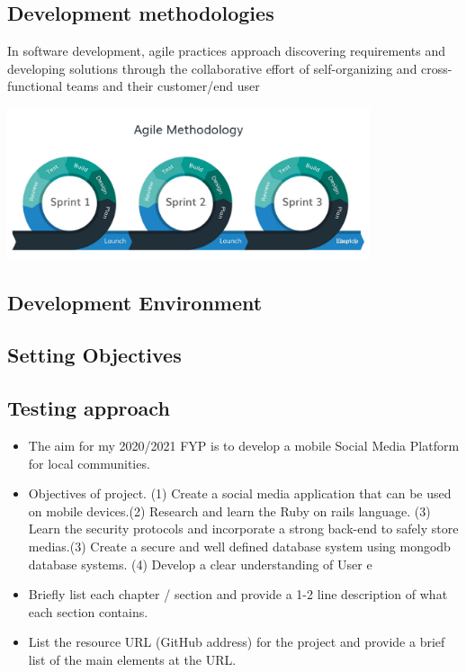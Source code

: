     
    \subsection{ Development methodologies }
    
    
In software development, agile practices approach discovering requirements and developing solutions through the collaborative effort of self-organizing and cross-functional teams and their customer/end user    
    
    
    

    \begin{center}    
      \includegraphics[width=0.8\textwidth]{final-year-project-template-master/img/agileSprint.jpg}
      
      
      


    \end{center}
    \subsection{ Development Environment  }
    \subsection{ Setting Objectives   }
    \subsection{ Testing approach   }




\begin{itemize}
\item %
The aim for my 2020/2021 FYP is to develop a mobile  Social Media Platform for local communities.
\item %
Objectives of project. (1) Create a social media application that can be used on mobile devices.(2) Research and learn the Ruby on rails language. (3) Learn the security protocols and incorporate  a strong back-end to safely store medias.(3) Create a secure and well defined database system using mongodb database systems. (4) Develop a clear understanding of User e
\item Briefly list each chapter / section and provide a 1-2 line description of what each section contains.
\item List the resource URL (GitHub address) for the project and provide a brief list of the main elements at the URL.
\end{itemize}



